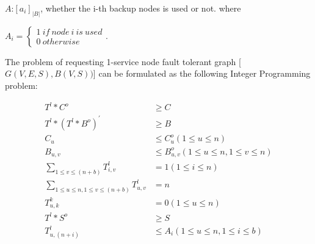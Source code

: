 $A$:$[a_i]_{|B|}$, whether the i-th backup nodes is used or not. where

${A_i}=\left\{ \begin{array}{l}1\ if\ node\ i\ is\ used\\
0\ otherwise
\end{array} \right.$.

The problem of requesting 1-service node fault tolerant graph [$G(V,E,S),B(V,S))$] can be formulated as the following Integer Programming problem:
\begin{center}
\begin{align}
\label{equ:ILPC10} T^l*C^o&\geq C\\
\label{equ:ILPC1} T^l*(T^l* B^o)^{'}&\geq B\\
\label{equ:ILPC11} C_{u}&\leq C^o_{u}(1\leq u\leq n)\\
\label{equ:ILPC7} B_{u,v}&\leq B^o_{u,v}(1\leq u\leq n,1\leq v\leq n)\\
\label{equ:ILPC2} \sum_{1\leq v\leq (n+b)}T^l_{i,v}&= 1 (1\leq i\leq n)\\
\label{equ:ILPC4} \sum_{1\leq u\leq n,1\leq v\leq (n+b)}T^l_{u,v}&=n \\
\label{equ:ILPC5}  T^k_{u,k}&=0 (1\leq u\leq n)\\
\label{equ:ILPC8} T^l*S^o &\geq S\\
\label{equ:ILPC9} T^l_{u,(n+i)} &\leq A_i(1\leq u\leq n,1\leq i\leq b)\\
\end{align}
\end{center}

